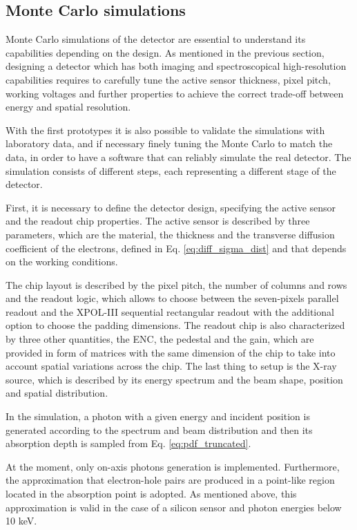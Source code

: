 \subsection{Monte Carlo simulations}
Monte Carlo simulations of the detector are essential to understand its capabilities depending on the design. As mentioned in the previous section, designing a detector which has both imaging and spectroscopical high-resolution capabilities requires to carefully tune the active sensor thickness, pixel pitch, working voltages and further properties to achieve the correct trade-off between energy and spatial resolution. 

With the first prototypes it is also possible to validate the simulations with laboratory data, and if necessary finely tuning the Monte Carlo to match the data, in order to have a software that can reliably simulate the real detector. The simulation consists of different steps, each representing a different stage of the detector.

First, it is necessary to define the detector design, specifying the active sensor and the readout chip properties. The active sensor is described by three parameters, which are the material, the thickness and the transverse diffusion coefficient of the electrons, defined in Eq. \ref{eq:diff_sigma_dist} and that depends on the working conditions.

The chip layout is described by the pixel pitch, the number of columns and rows and the readout logic, which allows to choose between the seven-pixels parallel readout and the XPOL-III sequential rectangular readout with the additional option to choose the padding dimensions. The readout chip is also characterized by three other quantities, the ENC, the pedestal and the gain, which are provided in form of matrices with the same dimension of the chip to take into account spatial variations across the chip. The last thing to setup is the X-ray source, which is described by its energy spectrum and the beam shape, position and spatial distribution.

In the simulation, a photon with a given energy and incident position is generated according to the spectrum and beam distribution and then its absorption depth is sampled from Eq. \ref{eq:pdf_truncated}.

At the moment, only on-axis photons generation is implemented. Furthermore, the approximation that electron-hole pairs are produced in a point-like region located in the absorption point is adopted. As mentioned above, this approximation is valid in the case of a silicon sensor and photon energies below 10 keV.

